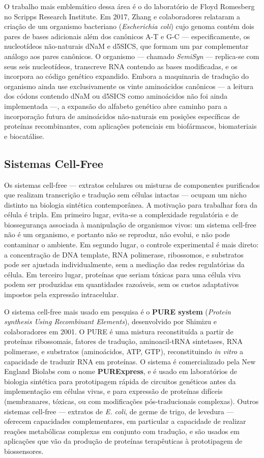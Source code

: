 O trabalho mais emblemático dessa área é o do laboratório de Floyd Romesberg no Scripps Research Institute. Em 2017, Zhang e colaboradores relataram a criação de um organismo bacteriano (\textit{Escherichia coli}) cujo genoma contém dois pares de bases adicionais além dos canônicos A-T e G-C --- especificamente, os nucleotídeos não-naturais dNaM e d5SICS, que formam um par complementar análogo aos pares canônicos. O organismo --- chamado \emph{SemiSyn} --- replica-se com seus seis nucleotídeos, transcreve RNA contendo as bases modificadas, e os incorpora ao código genético expandido. Embora a maquinaria de tradução do organismo ainda use exclusivamente os vinte aminoácidos canônicos --- a leitura dos códons contendo dNaM ou d5SICS como aminoácidos não foi ainda implementada ---, a expansão do alfabeto genético abre caminho para a incorporação futura de aminoácidos não-naturais em posições específicas de proteínas recombinantes, com aplicações potenciais em biofármacos, biomateriais e biocatálise.

\subsection{Sistemas Cell-Free}

Os sistemas cell-free --- extratos celulares ou misturas de componentes purificados que realizam transcrição e tradução sem células intactas --- ocupam um nicho distinto na biologia sintética contemporânea. A motivação para trabalhar fora da célula é tripla. Em primeiro lugar, evita-se a complexidade regulatória e de biossegurança associada à manipulação de organismos vivos: um sistema cell-free não é um organismo, e portanto não se reproduz, não evolui, e não pode contaminar o ambiente. Em segundo lugar, o controle experimental é mais direto: a concentração de DNA template, RNA polimerase, ribossomos, e substratos pode ser ajustada individualmente, sem a mediação das redes regulatórias da célula. Em terceiro lugar, proteínas que seriam tóxicas para uma célula viva podem ser produzidas em quantidades razoáveis, sem os custos adaptativos impostos pela expressão intracelular.

O sistema cell-free mais usado em pesquisa é o \textbf{PURE system} (\emph{Protein synthesis Using Recombinant Elements}), desenvolvido por Shimizu e colaboradores em 2001. O PURE é uma mistura reconstituída a partir de proteínas ribossomais, fatores de tradução, aminoacil-tRNA sintetases, RNA polimerase, e substratos (aminoácidos, ATP, GTP), reconstituindo \emph{in vitro} a capacidade de traduzir RNA em proteínas. O sistema é comercializado pela New England Biolabs com o nome \textbf{PURExpress}, e é usado em laboratórios de biologia sintética para prototipagem rápida de circuitos genéticos antes da implementação em células vivas, e para expressão de proteínas difíceis (membranares, tóxicas, ou com modificações pós-traducionais complexas). Outros sistemas cell-free --- extratos de \textit{E. coli}, de germe de trigo, de levedura --- oferecem capacidades complementares, em particular a capacidade de realizar reações metabólicas complexas em conjunto com tradução, e são usados em aplicações que vão da produção de proteínas terapêuticas à prototipagem de biossensores.



